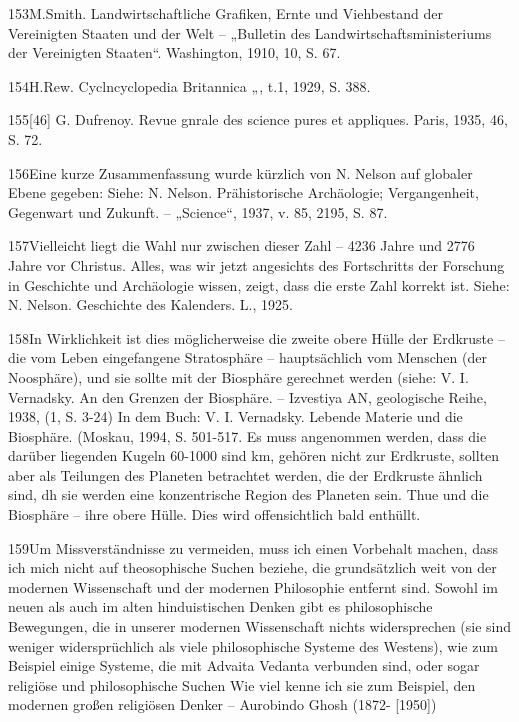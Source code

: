 \documentclass[11pt,a4paper]{book}
\begin{document}
153M.Smith. Landwirtschaftliche Grafiken, Ernte und Viehbestand der Vereinigten Staaten und der Welt -- „Bulletin des Landwirtschaftsministeriums der Vereinigten Staaten“. Washington, 1910, 10, S. 67.



154H.Rew. Cyclncyclopedia Britannica „, t.1, 1929, S. 388.



155[46] G. Dufrenoy. Revue gnrale des science pures et appliques. Paris, 1935, 46, S. 72.



156Eine kurze Zusammenfassung wurde kürzlich von N. Nelson auf globaler Ebene gegeben: Siehe: N. Nelson. Prähistorische Archäologie; Vergangenheit, Gegenwart und Zukunft. -- „Science“, 1937, v. 85, 2195, S. 87.



157Vielleicht liegt die Wahl nur zwischen dieser Zahl -- 4236 Jahre und 2776 Jahre vor Christus. Alles, was wir jetzt angesichts des Fortschritts der Forschung in Geschichte und Archäologie wissen, zeigt, dass die erste Zahl korrekt ist. Siehe: N. Nelson. Geschichte des Kalenders. L., 1925.



158In Wirklichkeit ist dies möglicherweise die zweite obere Hülle der Erdkruste -- die vom Leben eingefangene Stratosphäre -- hauptsächlich vom Menschen (der Noosphäre), und sie sollte mit der Biosphäre gerechnet werden (siehe: V. I. Vernadsky. An den Grenzen der Biosphäre. -- Izvestiya AN, geologische Reihe, 1938, (1, S. 3-24) In dem Buch: V. I. Vernadsky. Lebende Materie und die Biosphäre. (Moskau, 1994, S. 501-517. Es muss angenommen werden, dass die darüber liegenden Kugeln 60-1000 sind km, gehören nicht zur Erdkruste, sollten aber als Teilungen des Planeten betrachtet werden, die der Erdkruste ähnlich sind, dh sie werden eine konzentrische Region des Planeten sein. Thue und die Biosphäre -- ihre obere Hülle. Dies wird offensichtlich bald enthüllt.



159Um Missverständnisse zu vermeiden, muss ich einen Vorbehalt machen, dass ich mich nicht auf theosophische Suchen beziehe, die grundsätzlich weit von der modernen Wissenschaft und der modernen Philosophie entfernt sind. Sowohl im neuen als auch im alten hinduistischen Denken gibt es philosophische Bewegungen, die in unserer modernen Wissenschaft nichts widersprechen (sie sind weniger widersprüchlich als viele philosophische Systeme des Westens), wie zum Beispiel einige Systeme, die mit Advaita Vedanta verbunden sind, oder sogar religiöse und philosophische Suchen Wie viel kenne ich sie zum Beispiel, den modernen großen religiösen Denker -- Aurobindo Ghosh (1872- [1950])
\end{document}
